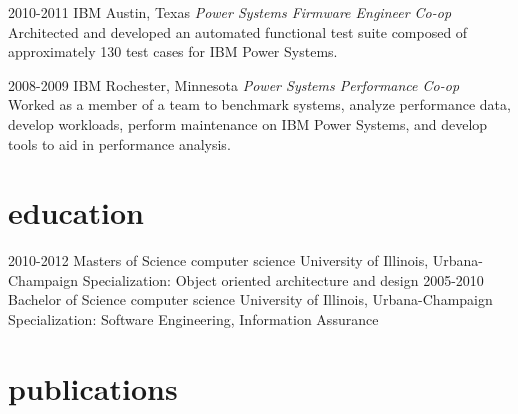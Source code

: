 \documentclass{friggeri-cv} %
\begin{document}
\begin{entrylist}
\entry
{2010-2011}
{IBM}
{Austin, Texas}
{\emph{Power Systems Firmware Engineer Co-op} \\
Architected and developed an automated functional test suite composed of approximately 130 test cases for IBM Power Systems.}
\end{entrylist}
\begin{entrylist}
\entry
{2008-2009}
{IBM}
{Rochester, Minnesota}
{\emph{Power Systems Performance Co-op} \\
Worked as a member of a team to benchmark systems, analyze performance data, develop workloads, perform
maintenance on IBM Power Systems, and develop tools to aid in performance analysis. }
\end{entrylist}


\section{education}

\begin{entrylist}
\entry
{2010-2012}
{Masters of Science {\normalfont computer science}}
{University of Illinois, Urbana-Champaign}
{Specialization: Object oriented architecture and design}
\entry
{2005-2010}
{Bachelor of Science {\normalfont computer science}}
{University of Illinois, Urbana-Champaign}
{Specialization: Software Engineering, Information Assurance}
\end{entrylist}


\section{publications}





\end{document}

